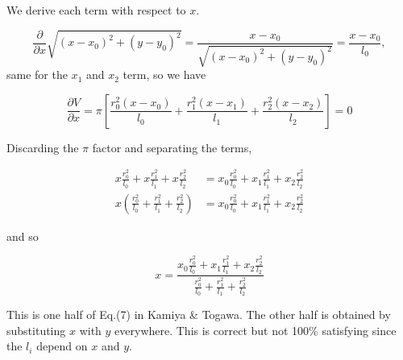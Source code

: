 \documentclass[a4paper, 11pt]{article} %
\newcommand{\sqlen}[1]{\ensuremath{(x - x_{#1})^2 + (y-y_{#1})^2}}
\newcommand{\rili}[1]{\ensuremath{\frac{r_{#1}^2}{l_{#1}}}}
\begin{document}
\begin{appendices}
We derive each term with respect to $x$.

\begin{equation*}
\frac{\partial}{\partial x} \sqrt{\sqlen{0}} = \frac{x-x_0}{\sqrt{\sqlen{0}}} = \frac{x-x_0}{l_0},
\end{equation*}
same for the $x_1$ and $x_2$ term, so we have

\begin{equation*}
\frac{\partial V}{\partial x} = \pi\left[ \frac{r_0^2(x-x_0)}{l_0} + \frac{r_1^2(x-x_1)}{l_1} + \frac{r_2^2(x-x_2)}{l_2}\right] = 0
\end{equation*}

Discarding the $\pi$ factor and separating the terms,

\begin{align*}
x\rili{0} + x\rili{1} + x\rili{2} &= x_0\rili{0} + x_1\rili{1} + x_2\rili{2} \\
x(\rili{0} + \rili{1} + \rili{2}) &= x_0\rili{0} + x_1\rili{1} + x_2\rili{2} 
\end{align*}

and so

\begin{equation*}
x = \frac{x_0\rili{0} + x_1\rili{1} + x_2\rili{2}}{\rili{0} + \rili{1} + \rili{2}}
\end{equation*}

This is one half of Eq.(7) in Kamiya \& Togawa. The other half is obtained by substituting $x$ with $y$ everywhere. This is
correct but not 100\% satisfying since the $l_i$ depend on $x$ and $y$.

\end{appendices}






\end{document}

